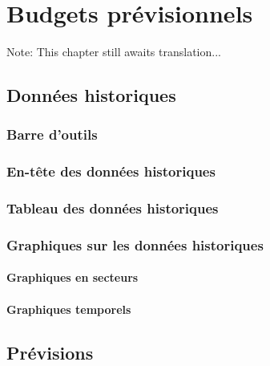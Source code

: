 
\chapter{Budgets prévisionnels\label{budget}}

Note: This chapter still awaits translation...


\section{Données historiques\label{budget-data}}


\subsection{Barre d'outils\label{budget-data-functions}}

\subsection{En-tête des données historiques\label{budget-data-source}}

\subsection{Tableau des données historiques\label{budget-data-table}}


\subsection{Graphiques sur les données historiques\label{budget-data-chart}}

\subsubsection{Graphiques en secteurs}

\subsubsection{Graphiques temporels}


\section{Prévisions\label{budget-estimate}}

